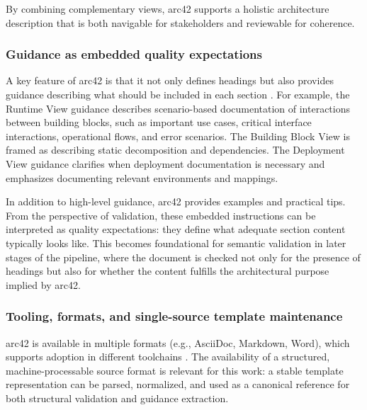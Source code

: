 By combining complementary views, arc42 supports a holistic architecture description that is both navigable for stakeholders and reviewable for coherence.

\subsubsection{Guidance as embedded quality expectations}
A key feature of arc42 is that it not only defines headings but also provides guidance describing what should be included in each section \cite{arc42_template}. For example, the Runtime View guidance describes scenario-based documentation of interactions between building blocks, such as important use cases, critical interface interactions, operational flows, and error scenarios. The Building Block View is framed as describing static decomposition and dependencies. The Deployment View guidance clarifies when deployment documentation is necessary and emphasizes documenting relevant environments and mappings.

In addition to high-level guidance, arc42 provides examples and practical tips. From the perspective of validation, these embedded instructions can be interpreted as quality expectations: they define what adequate section content typically looks like. This becomes foundational for semantic validation in later stages of the pipeline, where the document is checked not only for the presence of headings but also for whether the content fulfills the architectural purpose implied by arc42.

\subsubsection{Tooling, formats, and single-source template maintenance}
arc42 is available in multiple formats (e.g., AsciiDoc, Markdown, Word), which supports adoption in different toolchains \cite{arc42_template}. The availability of a structured, machine-processable source format is relevant for this work: a stable template representation can be parsed, normalized, and used as a canonical reference for both structural validation and guidance extraction.

